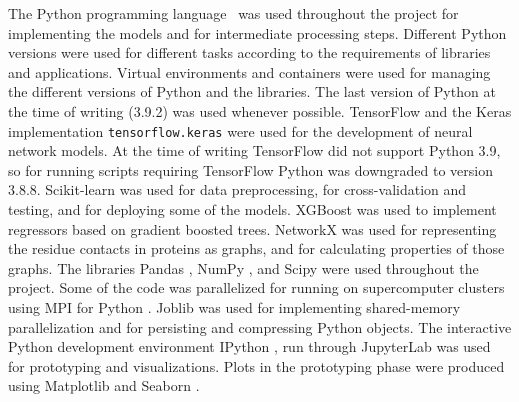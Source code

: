 The Python programming language~\parencite{vanRossum2010} was used throughout the project for implementing the models and for intermediate processing steps.
Different Python versions were used for different tasks according to the requirements of libraries and applications.
Virtual environments and containers were used for managing the different versions of Python and the libraries.
The last version of Python at the time of writing (3.9.2) was used whenever possible.
TensorFlow \parencite[version 2.4.1]{Abadi2015} and the Keras \parencite{Chollet2015} implementation \texttt{tensorflow.keras} were used for the development of neural network models.
At the time of writing TensorFlow did not support Python 3.9, so for running scripts requiring TensorFlow Python was downgraded to version 3.8.8.
Scikit-learn \parencite[version 0.24.1]{Pedregosa2011} was used for data preprocessing, for cross-validation and testing, and for deploying some of the models.
XGBoost \parencite[version 1.4.0rc1]{Chen2016} was used to implement regressors based on gradient boosted trees.
NetworkX \parencite[version 2.5.1]{Hagberg2008} was used for representing the residue contacts in proteins as graphs, and for calculating properties of those graphs.
The libraries Pandas \parencite[version 1.2.3]{pandas2021}, NumPy \parencite[version 1.20.1]{Harris2020}, and Scipy \parencite[version 1.6.2]{Virtanen2020} were used throughout the project.
Some of the code was parallelized for running on supercomputer clusters using MPI for Python \parencite[also called mpi4py,][version 3.0.3]{Dalcin2011}.
Joblib \parencite[version 1.0.0]{JDT2020} was used for implementing shared-memory parallelization and for persisting and compressing Python objects.
The interactive Python development environment IPython \parencite[version 7.19.0]{Perez2007}, run through JupyterLab \parencite[version 3.0.12]{Kluyver2016} was used for prototyping and visualizations.
Plots in the prototyping phase were produced using Matplotlib \parencite[version 3.4.1]{Hunter2007} and Seaborn \parencite[version 0.11.1]{Waskom2021}.

